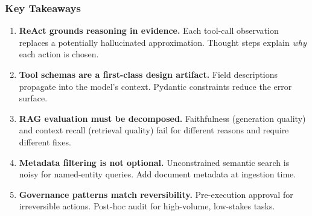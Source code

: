 \documentclass[9pt,t]{beamer}
\begin{document}
\begin{frame}
\frametitle{Key Takeaways}

\begin{enumerate}
  \item \textbf{ReAct grounds reasoning in evidence.}
        Each tool-call observation replaces a potentially hallucinated approximation.
        Thought steps explain \emph{why} each action is chosen.

  \item \textbf{Tool schemas are a first-class design artifact.}
        Field descriptions propagate into the model's context.
        Pydantic constraints reduce the error surface.

  \item \textbf{RAG evaluation must be decomposed.}
        Faithfulness (generation quality) and context recall (retrieval quality)
        fail for different reasons and require different fixes.

  \item \textbf{Metadata filtering is not optional.}
        Unconstrained semantic search is noisy for named-entity queries.
        Add document metadata at ingestion time.

  \item \textbf{Governance patterns match reversibility.}
        Pre-execution approval for irreversible actions.
        Post-hoc audit for high-volume, low-stakes tasks.
\end{enumerate}
\end{frame}

\end{document}
